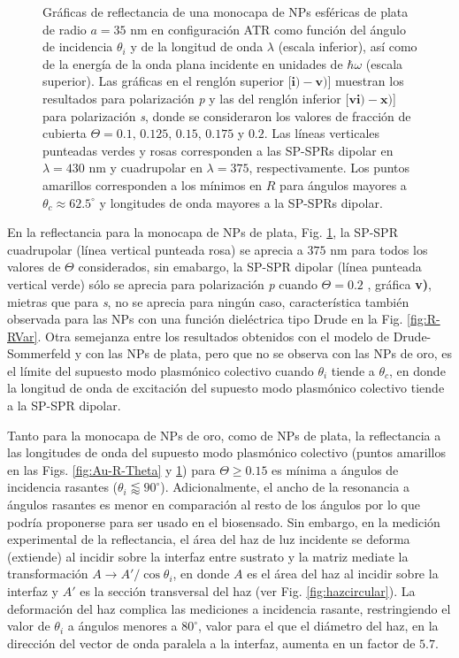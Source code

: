 \begin{figure}[h!]
\vspace*{-.5em}
	\caption{Gráficas de reflectancia de una monocapa de NPs esféricas de plata de radio $a=35$ nm en configuración ATR como función del ángulo de incidencia $\theta_i$ y de la longitud de onda $\lambda$ (escala inferior), así como de la energía de la onda plana incidente en unidades de $\hbar\omega$ (escala superior).  Las gráficas   en el renglón superior [$\mathbf{i)-v)}$] muestran los resultados para  polarización \emph{p} y las del renglón inferior  [$\mathbf{vi)-x)}$]  para polarización  \emph{s}, donde se consideraron los valores de fracción de cubierta $\Theta = 0.1,\,0.125,\,0.15,\, 0.175$ y $0.2$.  Las líneas verticales punteadas verdes y rosas corresponden a las SP-SPRs dipolar en $\lambda=430$ nm y  cuadrupolar en $\lambda=375$, respectivamente.  Los puntos amarillos corresponden a los mínimos en $R$ para ángulos mayores a $\theta_c\approx 62.5^\circ$ y longitudes de onda mayores a la SP-SPRs dipolar.
}	\label{fig:Ag-R-Theta}	
	\end{figure}	

En la reflectancia para la monocapa de NPs de plata, Fig. \ref{fig:Ag-R-Theta}, la SP-SPR cuadrupolar (línea vertical punteada rosa) se aprecia a $375$ nm para todos los valores de $\Theta$ considerados, sin emabargo, la SP-SPR dipolar (línea punteada vertical verde) sólo se aprecia para polarización \emph{p} cuando $\Theta=0.2$ , gráfica \textbf{v)}, mietras que para \emph{s}, no se aprecia para ningún caso, característica también observada para las NPs con una función dieléctrica tipo Drude en la Fig. \ref{fig:R-RVar}. Otra semejanza entre los resultados obtenidos con el modelo de Drude-Sommerfeld y con las NPs de plata, pero que no se observa con las NPs de oro, es el límite del supuesto modo plasmónico colectivo cuando $\theta_i$ tiende a $\theta_c$, en donde la longitud de onda de excitación del supuesto modo plasmónico colectivo tiende a la SP-SPR dipolar.

Tanto para la monocapa de NPs de oro, como de NPs de plata, la reflectancia a las longitudes de onda del supuesto modo plasmónico colectivo (puntos amarillos en las Figs. \ref{fig:Au-R-Theta} y \ref{fig:Ag-R-Theta}) para  $\Theta\geq 0.15$ es mínima a ángulos de incidencia rasantes ($\theta_i\lessapprox 90^\circ$).  Adicionalmente, el ancho de la resonancia a ángulos rasantes es menor en comparación al resto de los ángulos por lo que podría proponerse para ser usado en el biosensado. Sin embargo, en la medición experimental de la reflectancia, el área del haz de luz incidente se deforma (extiende) al incidir sobre la interfaz entre sustrato y la matriz mediate la transformación $A\to A'/\cos\theta_i$, en donde $A$ es el área del haz al incidir sobre la interfaz  y $A'$ es la sección transversal del haz (ver Fig. \ref{fig:hazcircular}). La deformación del haz complica las mediciones a incidencia rasante, restringiendo el valor de $\theta_i$ a ángulos menores a $80^\circ$, valor para el que el diámetro del haz, en la dirección del vector de onda  paralela a la interfaz, aumenta en un factor de $5.7$.

